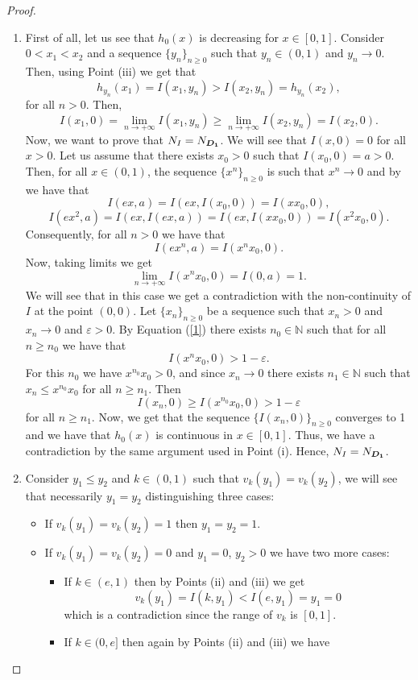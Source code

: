 \begin{proof}
\begin{enumerate}[label=(\roman*)]
		\item First of all, let us see that $h_0(x)$ is decreasing for $x \in [0,1]$. Consider $0<x_1<x_2$ and a sequence $\{y_n\}_{n \geq 0}$ such that $y_n\in(0,1)$ and $y_n \rightarrow 0$. Then, using Point (iii) we get that
		$$h_{y_n}(x_1)=I(x_1,y_n)>I(x_2,y_n)=h_{y_n}(x_2),$$
		for all $n>0$. Then,
		$$I(x_1,0)=\lim_{n \to +\infty}I(x_1,y_n) \geq \lim_{n \to +\infty} I(x_2,y_n)=I(x_2,0).$$
		Now, we want to prove that $N_I=N_{\bm{D_1}}$. We will see that $I(x,0)=0$ for all $x>0$. Let us assume that there exists $x_0>0$ such that $I(x_0,0)=a>0$. Then, for all $x\in(0,1)$, the sequence $\{x^n\}_{n \geq 0}$ is such that $x^n \to 0$ and by \LIex we have that
		$$ I(ex,a)=I(ex,I(x_0,0))=I(xx_0,0),$$
		$$I(ex^2,a)=I(ex,I(ex,a))=I(ex,I(xx_0,0))=I(x^2x_0,0).$$
		Consequently, for all $n>0$ we have that
		$$I(ex^n,a)=I(x^n x_0,0).$$
		Now, taking limits we get
		\begin{equation}
			\lim_{n \to +\infty} I(x^nx_0,0)=I(0,a)=1.
			\label{1}
		\end{equation}
		We will see that in this case we get a contradiction with the non-continuity of $I$ at the point $(0,0)$. Let $\{x_n\}_{n \geq 0}$ be a sequence such that $x_n>0$ and $x_n \to 0$ and $\varepsilon > 0$. By Equation (\ref{1}) there exists $n_0 \in \mathbb{N}$ such that for all $n \geq n_0$ we have that
		$$ I(x^{n}x_0,0)>1-\varepsilon.$$
		For this $n_0$ we have $x^{n_0}x_0>0$, and since $x_n \to 0$ there exists $n_1 \in \mathbb{N}$ such that $x_n \leq x^{n_0}x_0$ for all $n \geq n_1$. Then
		$$I(x_n,0) \geq I(x^{n_0}x_0,0) > 1-\varepsilon$$
		for all $n \geq n_1$. Now, we get that the sequence $\{I(x_n,0)\}_{n \geq 0}$ converges to 1 and we have that $h_0(x)$ is continuous in $x \in [0,1]$. Thus, we have a contradiction by the same argument used in Point (i). Hence, $N_I=N_{\bm{D_1}}$.
		\item Consider $y_1 \leq y_2$ and $k \in (0,1)$ such that $v_k(y_1)=v_k(y_2)$, we will see that necessarily $y_1=y_2$ distinguishing three cases:
		\begin{itemize}
			\item  If $v_k(y_1)=v_k(y_2)=1$ then $y_1=y_2=1$.
			\item  If $v_k(y_1)=v_k(y_2)=0$ and $y_1=0$, $y_2>0$ we have two more cases:
			\begin{itemize}
				\item  If $k \in (e,1)$ then by Points (ii) and (iii) we get  $$v_k(y_1)=I(k,y_1) < I(e,y_1) =y_1=0$$
				which is a contradiction since the range of $v_k$ is $[0,1]$.
				\item  If $k \in (0,e]$ then again by Points (ii) and (iii) we have

\end{itemize}
\end{itemize}
\end{enumerate}
\end{proof}
